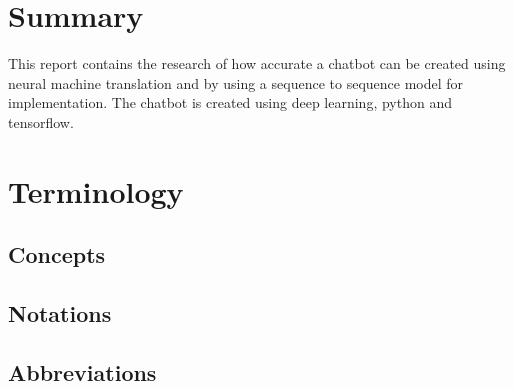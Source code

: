 \documentclass[english, a4paper]{report}
\newcommand{\summaryContent}{This report contains the research of how accurate a chatbot can be created using neural machine translation and by using a sequence to sequence model for implementation. The chatbot is created using deep learning, python and tensorflow.}
\begin{document}
\newpage
\tableofcontents

\newpage
\section{Summary} 
    \summaryContent

\newpage
\section{Terminology}
    \subsection{Concepts}
    {
        \printglossary
    }
    \subsection{Notations}
    {
        \printglossary[type=symbolslist]
    }
    \subsection{Abbreviations}
    {
        \printglossary[type=\acronymtype]
    }
    \listoffigures
    \listoftables
    
\setcounter{secnumdepth}{1}
\setcounter{secnumdepth}{2}

\newpage
\end{document}
